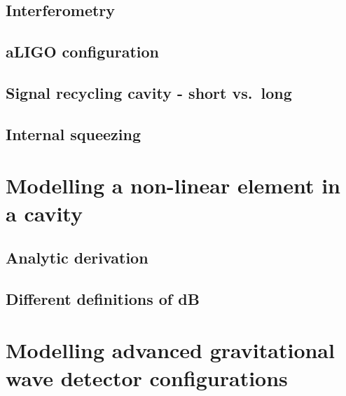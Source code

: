 \documentclass[aps,pra,superscriptaddress,reprint,nofootinbib]{revtex4-1}
\begin{document}
\subsection{Interferometry}

\subsection{aLIGO configuration}

\subsection{Signal recycling cavity - short vs.\ long}

\subsection{Internal squeezing}



\section{Modelling a non-linear element in a cavity}
\label{sec:sqzcavity}

\subsection{Analytic derivation}





\subsection{Different definitions of dB}





\section{Modelling advanced gravitational wave detector configurations}
\label{sec:aLIGOcomparison}
\end{document}
